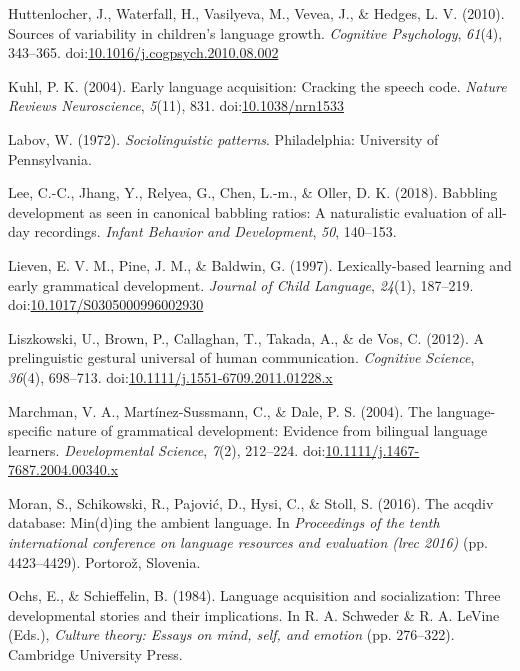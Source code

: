 \documentclass[,man,floatsintext]{apa6}
\begin{document}
\hypertarget{ref-huttenlocher2010sources}{}
Huttenlocher, J., Waterfall, H., Vasilyeva, M., Vevea, J., \& Hedges, L.
V. (2010). Sources of variability in children's language growth.
\emph{Cognitive Psychology}, \emph{61}(4), 343--365.
doi:\href{https://doi.org/10.1016/j.cogpsych.2010.08.002}{10.1016/j.cogpsych.2010.08.002}

\hypertarget{ref-kuhl2004early}{}
Kuhl, P. K. (2004). Early language acquisition: Cracking the speech
code. \emph{Nature Reviews Neuroscience}, \emph{5}(11), 831.
doi:\href{https://doi.org/10.1038/nrn1533}{10.1038/nrn1533}

\hypertarget{ref-labov1972sociolinguistic}{}
Labov, W. (1972). \emph{Sociolinguistic patterns}. Philadelphia:
University of Pennsylvania.

\hypertarget{ref-lee2018babbling}{}
Lee, C.-C., Jhang, Y., Relyea, G., Chen, L.-m., \& Oller, D. K. (2018).
Babbling development as seen in canonical babbling ratios: A
naturalistic evaluation of all-day recordings. \emph{Infant Behavior and
Development}, \emph{50}, 140--153.

\hypertarget{ref-lieven1997lexically}{}
Lieven, E. V. M., Pine, J. M., \& Baldwin, G. (1997). Lexically-based
learning and early grammatical development. \emph{Journal of Child
Language}, \emph{24}(1), 187--219.
doi:\href{https://doi.org/10.1017/S0305000996002930}{10.1017/S0305000996002930}

\hypertarget{ref-liszkowski2012prelinguistic}{}
Liszkowski, U., Brown, P., Callaghan, T., Takada, A., \& de Vos, C.
(2012). A prelinguistic gestural universal of human communication.
\emph{Cognitive Science}, \emph{36}(4), 698--713.
doi:\href{https://doi.org/10.1111/j.1551-6709.2011.01228.x}{10.1111/j.1551-6709.2011.01228.x}

\hypertarget{ref-marchman2004language}{}
Marchman, V. A., Martínez-Sussmann, C., \& Dale, P. S. (2004). The
language-specific nature of grammatical development: Evidence from
bilingual language learners. \emph{Developmental Science}, \emph{7}(2),
212--224.
doi:\href{https://doi.org/10.1111/j.1467-7687.2004.00340.x}{10.1111/j.1467-7687.2004.00340.x}

\hypertarget{ref-moran2016acqdiv}{}
Moran, S., Schikowski, R., Pajović, D., Hysi, C., \& Stoll, S. (2016).
The acqdiv database: Min(d)ing the ambient language. In
\emph{Proceedings of the tenth international conference on language
resources and evaluation (lrec 2016)} (pp. 4423--4429). Portorož,
Slovenia.

\hypertarget{ref-ochs1984language}{}
Ochs, E., \& Schieffelin, B. (1984). Language acquisition and
socialization: Three developmental stories and their implications. In R.
A. Schweder \& R. A. LeVine (Eds.), \emph{Culture theory: Essays on
mind, self, and emotion} (pp. 276--322). Cambridge University Press.
\end{document}

